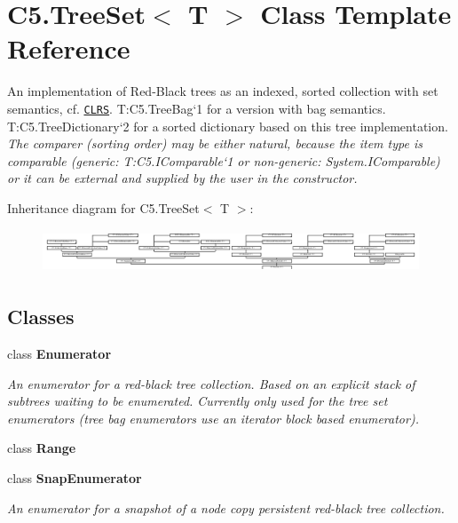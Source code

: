 \hypertarget{class_c5_1_1_tree_set}{}\section{C5.\+Tree\+Set$<$ T $>$ Class Template Reference}
\label{class_c5_1_1_tree_set}


An implementation of Red-\/\+Black trees as an indexed, sorted collection with set semantics, cf. \href{litterature.htm#CLRS}{\tt C\+L\+R\+S}. T\+:\+C5.\+Tree\+Bag`1 for a version with bag semantics. T\+:\+C5.\+Tree\+Dictionary`2 for a sorted dictionary based on this tree implementation. {\itshape  The comparer (sorting order) may be either natural, because the item type is comparable (generic\+: T\+:\+C5.\+I\+Comparable`1 or non-\/generic\+: System.\+I\+Comparable) or it can be external and supplied by the user in the constructor.}  


Inheritance diagram for C5.\+Tree\+Set$<$ T $>$\+:\begin{figure}[H]
\begin{center}
\leavevmode
\includegraphics[height=1.314554cm]{class_c5_1_1_tree_set}
\end{center}
\end{figure}
\subsection*{Classes}
\begin{DoxyCompactItemize}
\item 
class {\bfseries Enumerator}
\begin{DoxyCompactList}\small\item\em An enumerator for a red-\/black tree collection. Based on an explicit stack of subtrees waiting to be enumerated. Currently only used for the tree set enumerators (tree bag enumerators use an iterator block based enumerator). \end{DoxyCompactList}\item 
class {\bfseries Range}
\item 
class {\bfseries Snap\+Enumerator}
\begin{DoxyCompactList}\small\item\em An enumerator for a snapshot of a node copy persistent red-\/black tree collection. \end{DoxyCompactList}\end{DoxyCompactItemize}
